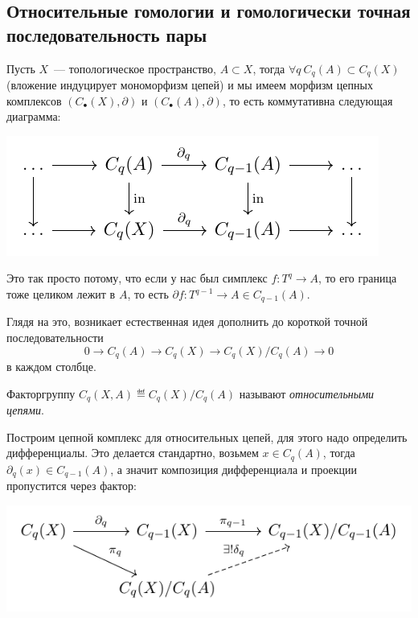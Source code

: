 \subsection{Относительные гомологии и гомологически точная последовательность пары}

    Пусть $X$~--- топологическое пространство, $A \subset X$, тогда $\forall q \ C_{q}(A) \subset C_{q}(X)$ (вложение индуцирует мономорфизм цепей)
    и мы имеем морфизм цепных комплексов $(C_{\bullet}(X), \partial)$ и $(C_{\bullet}(A), \partial)$, то есть коммутативна следующая диаграмма:
    \begin{center}
        \includegraphics{lectures/0/pictures/cd_4}
    \end{center}
    Это так просто потому, что если у нас был симплекс $f\colon T^{q} \to A$, то его граница тоже целиком лежит в $A$,
    то есть $\partial f\colon T^{q - 1} \to A \in C_{q - 1}(A)$.

    Глядя на это, возникает естественная идея дополнить до короткой точной последовательности
    \[ 0 \to C_{q}(A) \to C_{q}(X) \to C_{q}(X)/C_{q}(A) \to 0 \]
    в каждом столбце.

    \begin{definition}
        Факторгруппу $C_{q}(X, A) \eqdef C_{q}(X)/C_{q}(A)$ называют \emph{относительными цепями}. 
    \end{definition}

    Построим цепной комплекс для относительных цепей, для этого надо определить дифференциалы.
    Это делается стандартно, возьмем $x \in C_{q}(A)$, тогда $\partial_{q}(x) \in C_{q - 1}(A)$, а значит
    композиция дифференциала и проекции пропустится через фактор:

    \begin{center}
        \includegraphics{lectures/0/pictures/cd_5}
    \end{center}

